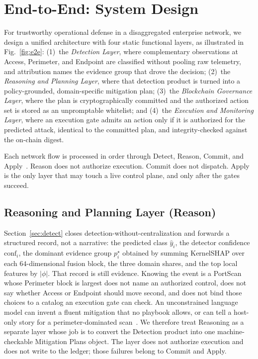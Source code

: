 
\section{End-to-End: System Design}
\label{sec:system}

For trustworthy operational defense in a disaggregated enterprise network, we design a unified architecture with four static functional layers, as illustrated in Fig.~\ref{fig:e2e}: (1)~the \emph{Detection Layer}, where complementary observations at Access, Perimeter, and Endpoint are classified without pooling raw telemetry, and attribution names the evidence group that drove the decision; (2)~the \emph{Reasoning and Planning Layer}, where that detection product is turned into a policy-grounded, domain-specific mitigation plan; (3)~the \emph{Blockchain Governance Layer}, where the plan is cryptographically committed and the authorized action set is stored as an unpromptable whitelist; and (4)~the \emph{Execution and Monitoring Layer}, where an execution gate admits an action only if it is authorized for the predicted attack, identical to the committed plan, and integrity-checked against the on-chain digest.

Each network flow is processed in order through Detect, Reason, Commit, and Apply~\cite{li2025}. Reason does not authorize execution. Commit does not dispatch. Apply is the only layer that may touch a live control plane, and only after the gates succeed.



\subsection{Reasoning and Planning Layer (Reason)}
\label{sec:reason}

Section~\ref{sec:detect} closes detection-without-centralization and forwards a structured record, not a narrative: the predicted class $\hat{y}_i$, the detector confidence $\mathrm{conf}_i$, the dominant evidence group $p_i^{\star}$ obtained by summing KernelSHAP over each $64$-dimensional fusion block, the three domain shares, and the top local features by $\lvert\phi\rvert$. That record is still evidence. Knowing the event is a PortScan whose Perimeter block is largest does not name an authorized control, does not say whether Access or Endpoint should move second, and does not bind those choices to a catalog an execution gate can check. An unconstrained language model can invent a fluent mitigation that no playbook allows, or can tell a host-only story for a perimeter-dominated scan~\cite{xi2023,kshetri2025agentic}. We therefore treat Reasoning as a separate layer whose job is to convert the Detection product into one machine-checkable Mitigation Plans object. The layer does not authorize execution and does not write to the ledger; those failures belong to Commit and Apply.

